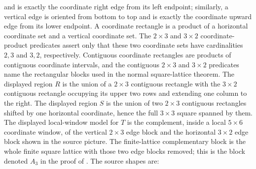 \begin{definition}
    and is exactly the coordinate right edge from its left endpoint; similarly,
    a vertical edge is oriented from bottom to top and is exactly the
    coordinate upward edge from its lower endpoint.
    A coordinate rectangle is a product of a horizontal coordinate set and a
    vertical coordinate set. The $2\times3$ and
    $3\times2$ coordinate-product predicates assert only that these two
    coordinate sets have cardinalities $2,3$ and $3,2$, respectively.
    Contiguous coordinate rectangles are products of contiguous coordinate
    intervals, and the contiguous $2\times3$ and $3\times2$ predicates name the
    rectangular blocks used in the normal square-lattice theorem. The
    displayed region $R$ is the union of a $2\times3$ contiguous rectangle
    with the $3\times2$ contiguous rectangle occupying its upper two rows and
    extending one column to the right. The displayed region $S$ is the union
    of two $2\times3$ contiguous rectangles shifted by one horizontal
    coordinate, hence the full $3\times3$ square spanned by them. The
    displayed local-window model for $T$ is the complement, inside a local
    $5\times6$ coordinate window, of the vertical $2\times3$ edge block
    and the horizontal $3\times2$ edge block shown in the source picture.
    The finite-lattice complementary block is the whole finite square lattice
    with those two edge blocks removed; this is the block denoted $A_3$ in
    the proof of \cite[Theorem~3]{Molnar2018NormalPEPS}.
    The source shapes are:
    \begin{center}
        \TNPEPSNormalRegionsRS

        \vspace{0.5em}

        \TNPEPSNormalRegionT
    \end{center}
\end{definition}

